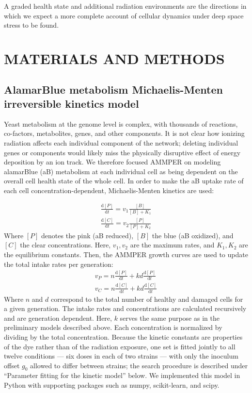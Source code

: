 \documentclass{asmarticle}
\begin{document}
A graded health state and additional radiation environments are the directions in which we expect a more complete account of cellular dynamics under deep space stress to be found.


\section{MATERIALS AND METHODS}
\subsection{AlamarBlue metabolism Michaelis-Menten irreversible kinetics model}
Yeast metabolism at the genome level is complex, with thousands of reactions, co-factors, metabolites, genes, and other components. It is not clear how ionizing radiation affects each individual component of the network; deleting individual genes or components would likely miss the physically disruptive effect of energy deposition by an ion track. We therefore focused AMMPER on modeling alamarBlue (aB) metabolism at each individual cell as being dependent on the overall cell health state of the whole cell. In order to make the aB uptake rate of each cell concentration-dependent, Michaelis-Menten kinetics \cite{chang2005physical, atkins2011physical, wilson1988biochemistry} are used:

\begin{align}
    \frac{\mathrm{d}[P]}{\mathrm{d}t} = v_{1}\frac{[B]}{[B] + K_1}\label{MK_1}
    \\
    \frac{\mathrm{d}[C]}{\mathrm{d}t} = v_{2}\frac{[P]}{[P] + K_2}\label{MK_2}
\end{align}
Where $[P]$ denotes the pink (aB reduced), $[B]$ the blue (aB oxidized), and $[C]$ the clear concentrations. Here, $v_1, v_2$ are the maximum rates, and $K_1, K_2$ are the equilibrium constants.
Then, the AMMPER growth curves are used to update the total intake rates per generation:
\begin{align}
    v_P = n \frac{\mathrm{d}[P]}{\mathrm{d}t} + k d \frac{\mathrm{d}[P]}{\mathrm{d}t}
    \\
    v_C = n \frac{\mathrm{d}[C]}{\mathrm{d}t} + k d \frac{\mathrm{d}[C]}{\mathrm{d}t}
\end{align}
Where $n$ and $d$ correspond to the total number of healthy and damaged cells for a given generation. The intake rates and concentrations are calculated recursively and are generation dependent. Here, $k$ serves the same purpose as in the preliminary models described above. Each concentration is normalized by dividing by the total concentration. Because the kinetic constants are properties of the dye rather than of the radiation exposure, one set is fitted jointly to all twelve conditions --- six doses in each of two strains --- with only the inoculum offset $g_0$ allowed to differ between strains; the search procedure is described under ``Parameter fitting for the kinetic model'' below. We implemented this model in Python with supporting packages such as numpy, scikit-learn, and scipy.
\end{document}
